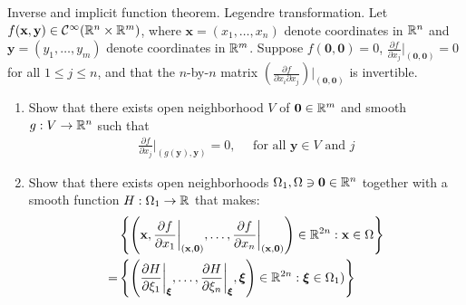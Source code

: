 \documentclass{report}
\begin{document}
\begin{question}{Inverse and implicit function theorem. Legendre transformation.}{}
Let $f(\textbf{x},\textbf{y})\in \mathcal{C}^{\infty} (\mathbb{R}^n \times \mathbb{R}^m)$, where $\textbf{x}=(x_1,\dots ,x_n)$ denote coordinates in $\mathbb{R}^n$ and  $\textbf{y}= (y_1,\dots ,y_m)$ denote coordinates in $\mathbb{R}^m$. Suppose $f(\textbf{0},\textbf{0})=0$, $\frac{\partial f}{\partial x_j}\big|_{(\textbf{0},\textbf{0})}=0$ for all $1\leq j\leq n$, and that the $n$-by-$n$ matrix  $\left(\frac{\partial f}{\partial x_i\partial x_j} \right)\big|_{(\textbf{0},\textbf{0})}$ is invertible. 
\begin{enumerate}[label=(\Roman*)]
  \item Show that there exists open neighborhood $V$ of  $\textbf{0}\in\mathbb{R}^m$ and smooth $g:V\rightarrow \mathbb{R}^n$ such that  
    \begin{align*}
    \frac{\partial f}{\partial x_j}\bigg    |_{\left(g(\textbf{y}),\textbf{y} \right)}=0,\quad \text{ for all }\textbf{y}\in V\text{ and }j
    \end{align*} 
    \item Show that there exists open neighborhoods $\Omega_1,\Omega\ni\textbf{0}\in\mathbb{R}^n$ together with a smooth function $H:\Omega_1 \rightarrow \mathbb{R}$ that makes: 
 \begin{align}
\label{EQGs1} &\left\{ \left(\textbf{x}, \frac{\partial f}{\partial x_1} \bigg|_{(\textbf{x},\textbf{0})}, \dots ,\frac{\partial f}{\partial x_n} \bigg  |_{(\textbf{x},\textbf{0})}\right)\in\mathbb{R}^{2n}:\textbf{x} \in \Omega \right\} \\
\label{EQGs2}   =& \left\{  \left( \frac{\partial H}{\partial \xi_1} \bigg |_{\boldsymbol{\xi}} , \dots ,\frac{\partial H}{\partial \xi_n} \bigg |_{\boldsymbol{\xi}},  \boldsymbol{\xi} \right) \in\mathbb{R}^{2n}: \boldsymbol{\xi}\in \Omega_1)   \right\}
 \end{align}
\end{enumerate}
\end{question}
\end{document}

